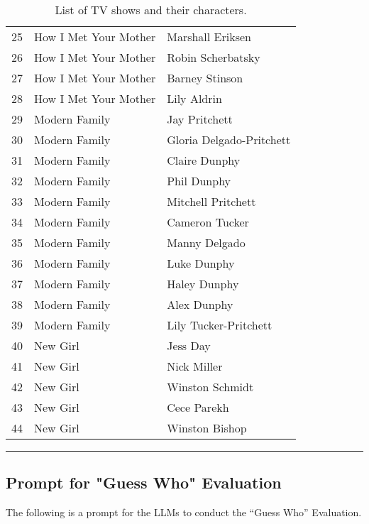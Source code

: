 \begin{table}[htbp]
\begin{tabularx}{0.70\textwidth}{lXX}
25 & How I Met Your Mother  & Marshall Eriksen      \\
26 & How I Met Your Mother  & Robin Scherbatsky      \\
27 & How I Met Your Mother  & Barney Stinson         \\
28 & How I Met Your Mother  & Lily Aldrin            \\
29 & Modern Family          & Jay Pritchett          \\
30 & Modern Family          & Gloria Delgado-Pritchett\\
31 & Modern Family          & Claire Dunphy          \\
32 & Modern Family          & Phil Dunphy            \\
33 & Modern Family          & Mitchell Pritchett     \\
34 & Modern Family          & Cameron Tucker         \\
35 & Modern Family          & Manny Delgado          \\
36 & Modern Family          & Luke Dunphy            \\
37 & Modern Family          & Haley Dunphy           \\
38 & Modern Family          & Alex Dunphy            \\
39 & Modern Family          & Lily Tucker-Pritchett  \\
40 & New Girl               & Jess Day               \\
41 & New Girl               & Nick Miller            \\
42 & New Girl               & Winston Schmidt                \\
43 & New Girl               & Cece Parekh            \\
44 & New Girl               & Winston Bishop         \\
\bottomrule
\end{tabularx}
\caption{List of TV shows and their characters.}
\label{tab:tvshows}
\end{table}

\vspace{0.5em}

\noindent\rule{\columnwidth}{0.3mm}
\subsection{Prompt for "Guess Who" Evaluation}
\label{sec:appendix_automatic_guess_who}


The following is a prompt for the LLMs to conduct the ``Guess Who'' Evaluation.  

